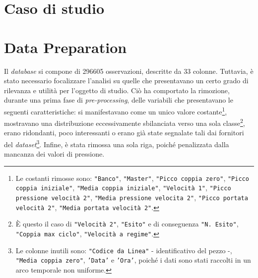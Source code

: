 \documentclass[fleqn,10pt]{SelfArx} %
\affiliation{\textsuperscript{1}\textit{794126, Dipartimento di Informatica, Sistemistica e Comunicazione}} %
\affiliation{\textsuperscript{2}\textit{793516, Dipartimento di Informatica, Sistemistica e Comunicazione}} %
\affiliation{\textsuperscript{3}\textit{?, Dipartimento di Informatica, Sistemistica e Comunicazione}}
\begin{document}
\flushbottom %

\maketitle %

\tableofcontents %

\thispagestyle{empty} %


\section*{Caso di studio} %



\section{Data Preparation}
Il \textit{database} si compone di 296605 osservazioni, descritte da 33 colonne. Tuttavia, è stato necessario focalizzare l'analisi su quelle che presentavano un certo grado di rilevanza e utilità per l'oggetto di studio. Ciò ha comportato la rimozione, durante una prima fase di \textit{pre-processing}, delle variabili che presentavano le seguenti caratteristiche: si manifestavano come un unico valore costante\footnote{Le costanti rimosse sono: \texttt{"Banco"}, \texttt{"Master"}, \texttt{"Picco coppia zero"}, \texttt{"Picco coppia iniziale"}, \texttt{"Media coppia iniziale"}, \texttt{"Velocità 1"}, \texttt{"Picco pressione velocità 2"}, \texttt{"Media pressione velocita 2"}, \texttt{"Picco portata velocità 2"}, \texttt{"Media portata velocità 2"}.}, mostravano una distribuzione eccessivamente sbilanciata verso una sola classe\footnote{È questo il caso di \texttt{"Velocità 2"}, \texttt{"Esito"} e di conseguenza \texttt{"N. Esito"}, \texttt{"Coppia max ciclo"}, \texttt{"Velocità a regime"}.}, erano ridondanti, poco interessanti o erano già state segnalate tali dai fornitori del \textit{dataset}\footnote{Le colonne inutili sono: \texttt{"Codice da Linea"} - identificativo del pezzo -, \texttt{"Media coppia zero"}, \texttt{'Data'} e \texttt{'Ora'}, poiché i dati sono stati raccolti in un arco temporale non uniforme.}. Infine, è stata rimossa una sola riga, poiché penalizzata dalla mancanza dei valori di pressione.
\end{document}
